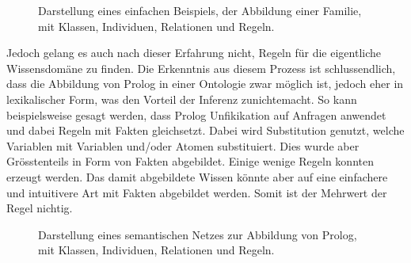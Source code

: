 \begin{figure}[H]
\centering {}
\caption{Darstellung eines einfachen Beispiels, der Abbildung einer Familie, mit Klassen, Individuen, Relationen und Regeln.\label{fig:familien_netz}\protect\footnotemark}
\end{figure}

Jedoch gelang es auch nach dieser Erfahrung nicht, Regeln für die eigentliche Wissensdomäne zu finden. Die Erkenntnis aus diesem Prozess ist schlussendlich, dass die Abbildung von Prolog in einer Ontologie zwar möglich ist, jedoch eher in lexikalischer Form, was den Vorteil der Inferenz zunichtemacht. So kann beispielsweise gesagt werden, dass Prolog Unfikikation auf Anfragen anwendet und dabei Regeln mit Fakten gleichsetzt. Dabei wird Substitution genutzt, welche Variablen mit Variablen und/oder Atomen substituiert. Dies wurde aber Grösstenteils in Form von Fakten abgebildet. Einige wenige Regeln konnten erzeugt werden. Das damit abgebildete Wissen könnte aber auf eine einfachere und intuitivere Art mit Fakten abgebildet werden. Somit ist der Mehrwert der Regel nichtig.

\begin{figure}[H]
\centering {}
\caption{Darstellung eines semantischen Netzes zur Abbildung von Prolog, mit Klassen, Individuen, Relationen und Regeln.\label{fig:prolog_netz}\protect\footnotemark}
\end{figure}

